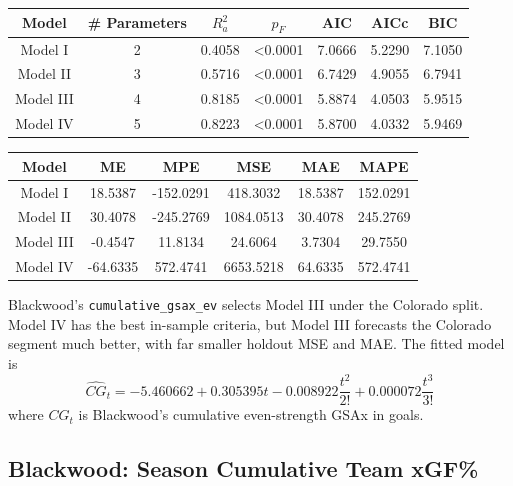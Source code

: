 \documentclass[
  10pt,
]{extarticle}
\begin{document}
\begin{center}
\normalsize

\begin{tabular}{ccccccc}
\toprule
Model & \# Parameters & $R_a^2$ & $p_F$ & AIC & AICc & BIC\\
\midrule
Model I & 2 & 0.4058 & <0.0001 & 7.0666 & 5.2290 & 7.1050\\
Model II & 3 & 0.5716 & <0.0001 & 6.7429 & 4.9055 & 6.7941\\
Model III & 4 & 0.8185 & <0.0001 & 5.8874 & 4.0503 & 5.9515\\
Model IV & 5 & 0.8223 & <0.0001 & 5.8700 & 4.0332 & 5.9469\\
\bottomrule
\end{tabular}
\normalsize
\end{center}\begin{center}
\normalsize

\begin{tabular}{cccccc}
\toprule
Model & ME & MPE & MSE & MAE & MAPE\\
\midrule
Model I & 18.5387 & -152.0291 & 418.3032 & 18.5387 & 152.0291\\
Model II & 30.4078 & -245.2769 & 1084.0513 & 30.4078 & 245.2769\\
Model III & -0.4547 & 11.8134 & 24.6064 & 3.7304 & 29.7550\\
Model IV & -64.6335 & 572.4741 & 6653.5218 & 64.6335 & 572.4741\\
\bottomrule
\end{tabular}
\normalsize
\end{center}

Blackwood's \texttt{cumulative\_gsax\_ev} selects Model III under the Colorado split. Model IV has the best in-sample criteria, but Model III forecasts the Colorado segment much better, with far smaller holdout MSE and MAE. The fitted model is
\[
\widehat{CG}_t = -5.460662 + 0.305395 t - 0.008922 \frac{t^2}{2!} + 0.000072 \frac{t^3}{3!}
\]
where \(CG_t\) is Blackwood's cumulative even-strength GSAx in goals.

\subsection{Blackwood: Season Cumulative Team xGF\%}\label{blackwood-season-cumulative-team-xgf}
\end{document}
